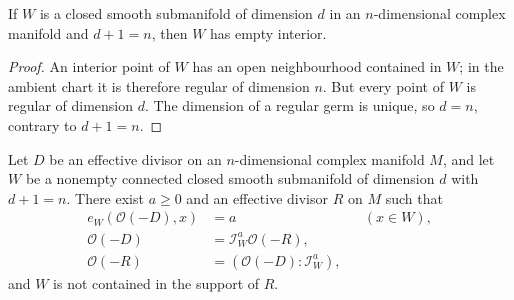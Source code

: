 \begin{lemma}
\label{hir:divisor-smooth-carrier-empty-interior}
\leanok
If $W$ is a closed smooth submanifold of dimension $d$ in an
$n$-dimensional complex manifold and $d+1=n$, then $W$ has empty
interior.
\end{lemma}
\begin{proof}
An interior point of $W$ has an open neighbourhood contained in $W$;
in the ambient chart it is therefore regular of dimension $n$.
But every point of $W$ is regular of dimension $d$. The dimension
of a regular germ is unique, so $d=n$, contrary to $d+1=n$.
\end{proof}

\begin{theorem}
\label{hir:divisor-connected-component-residual}
\leanok
Let $D$ be an effective divisor on an $n$-dimensional complex
manifold $M$, and let $W$ be a nonempty connected closed smooth
submanifold of dimension $d$ with $d+1=n$. There exist $a\geq0$
and an effective divisor $R$ on $M$ such that
\[
 \begin{aligned}
 e_W(\mathcal O(-D),x)&=a &&(x\in W),\\
 \mathcal O(-D)&=\mathcal I_W^a\mathcal O(-R),\\
 \mathcal O(-R)&=(\mathcal O(-D):\mathcal I_W^a),
 \end{aligned}
\]
and $W$ is not contained in the support of $R$.
\end{theorem}

